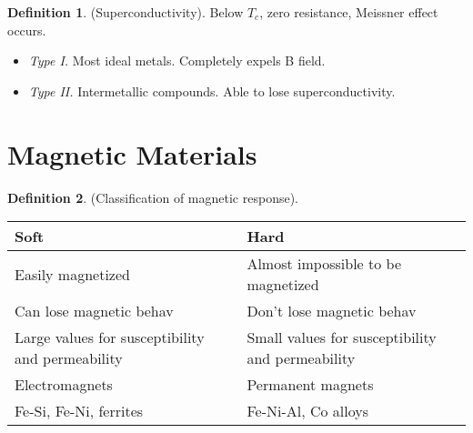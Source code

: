 \documentclass{article}
\theoremstyle{definition}
\newtheorem{definition}{Definition}[section]
\begin{document}
\begin{definition}
    (Superconductivity). Below $T_c$, zero resistance, Meissner effect occurs.
    \begin{itemize}
        \item \textit{Type I.} Most ideal metals. Completely expels B field.
        \item \textit{Type II.} Intermetallic compounds. Able to lose superconductivity.
    \end{itemize}
\end{definition}

\cleardoublepage

\section{Magnetic Materials}

\begin{definition}
    (Classification of magnetic response).
    \begin{table}[ht]
        \centering
        \begin{tabular}{ll}
            \toprule
            Soft & Hard \\
            \midrule
            Easily magnetized & Almost impossible to be magnetized \\
            Can lose magnetic behav & Don't lose magnetic behav \\
            Large values for susceptibility and permeability & Small values for susceptibility and permeability \\
            Electromagnets & Permanent magnets \\
            Fe-Si, Fe-Ni, ferrites & Fe-Ni-Al, Co alloys \\
            \bottomrule
        \end{tabular}
    \end{table}
\end{definition}
\end{document}
